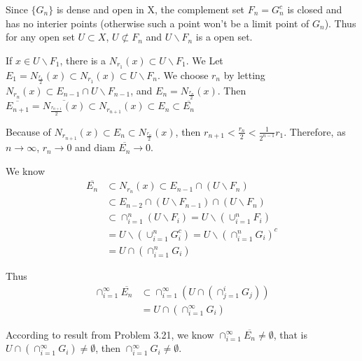 \documentclass{article}
\begin{document}
Since $ \{G_n\}$ is dense and open in X, the complement set $F_n = G_{n}^{c}$ is closed and has no interier points (otherwise such a point won't be a limit point of $G_n$).
Thus for any open set $U \subset X$, $U \not\subset F_n $ and $U \backslash F_n$ is a open set. %


If $x \in U \backslash F_1$, there is a $N_{r_1}(x) \subset U \backslash F_1$. We Let $E_1 = N_{\frac{r_1}{2}}(x)\subset N_{r_1}(x) \subset U \backslash F_n $.
We choose $r_n$ by letting $N_{r_n}(x) \subset E_{n-1} \cap U \backslash F_{n-1}$, and $E_n = N_{\frac{r_n}{2}}(x) $.
Then $\overline{E_{n+1}} = \overline{N_{\frac{r_{n+1}}{2}}(x)} \subset N_{r_{n+1}}(x) \subset E_{n} \subset \overline{E_{n}} $

Because of $ N_{r_{n+1}}(x) \subset E_n \subset N_{\frac{r_{n}}{2}}(x) $, then $r_{n+1} < \frac{r_n}{2} < \frac{1}{2^{n-1}} r_1$. Therefore, as $n \rightarrow \infty$, $ r_n \rightarrow 0 $ and $ \text{diam } \overline{E_n} \rightarrow 0 $.

We know
\begin{equation}
  \begin{split}
    \overline{E_n} &\subset N_{r_{n}}(x) \subset E_{n-1} \cap (U \backslash F_n) \\
    &\subset  E_{n-2} \cap (U \backslash F_{n-1}) \cap (U \backslash F_n)\\
    & \subset \cap_{i=1}^{n} (U \backslash F_i)  = U \backslash (\cup_{i=1}^{n} F_i)\\
    & = U \backslash (\cup_{i=1}^{n} G_{i}^{c}) = U \backslash (\cap_{i=1}^{n} G_{i})^{c}\\
    & = U \cap (\cap_{i=1}^{n} G_{i})
  \end{split}
\end{equation}

Thus
\begin{equation}
  \begin{split}
    \cap_{i=1}^{\infty} \overline{E_n} &\subset \cap_{i=1}^{\infty} (U \cap (\cap_{j=1}^{i} G_{j}))\\
    & = U \cap (\cap_{i=1}^{\infty} G_{i})
  \end{split}
\end{equation}

According to result from Problem 3.21, we know $\cap_{i=1}^{\infty} \overline{E_n} \neq \emptyset $, that is $ U \cap (\cap_{i=1}^{\infty} G_{i}) \neq \emptyset $, then $\cap_{i=1}^{\infty} G_{i} \neq \emptyset $.
\end{document}
